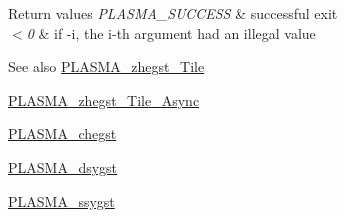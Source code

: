 \begin{DoxyRetVals}{Return values}
{\em P\+L\+A\+S\+M\+A\+\_\+\+S\+U\+C\+C\+E\+S\+S} & successful exit \\
\hline
{\em $<$0} & if -\/i, the i-\/th argument had an illegal value\\
\hline
\end{DoxyRetVals}
\begin{DoxySeeAlso}{See also}
\hyperlink{group__PLASMA__Complex64__t__Tile_gaa28f6da2b7b8e8af7abf429f7f01047d_gaa28f6da2b7b8e8af7abf429f7f01047d}{P\+L\+A\+S\+M\+A\+\_\+zhegst\+\_\+\+Tile} 

\hyperlink{group__PLASMA__Complex64__t__Tile__Async_ga2b7df2f947d4f57750cf4f0145c80624_ga2b7df2f947d4f57750cf4f0145c80624}{P\+L\+A\+S\+M\+A\+\_\+zhegst\+\_\+\+Tile\+\_\+\+Async} 

\hyperlink{group__PLASMA__Complex32__t_gac4b81a8ac8396c84a27d8a0b719bc379_gac4b81a8ac8396c84a27d8a0b719bc379}{P\+L\+A\+S\+M\+A\+\_\+chegst} 

\hyperlink{group__double_ga7ab44c615960d36295086012efc45a7d_ga7ab44c615960d36295086012efc45a7d}{P\+L\+A\+S\+M\+A\+\_\+dsygst} 

\hyperlink{group__float_ga66b77c0de44f80760c4184756250e75e_ga66b77c0de44f80760c4184756250e75e}{P\+L\+A\+S\+M\+A\+\_\+ssygst} 
\end{DoxySeeAlso}
\hypertarget{group__PLASMA__Complex64__t_gaec004491cb00c99f63f9604c84ef8f43_gaec004491cb00c99f63f9604c84ef8f43}{}
